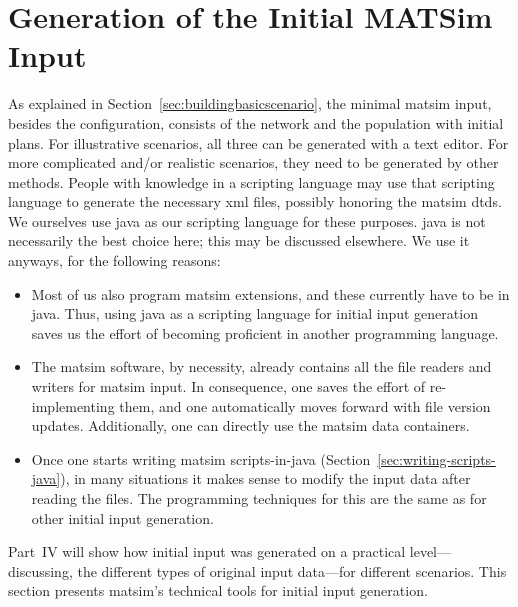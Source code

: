 \section{Generation of the Initial MATSim Input}
\label{sec:extending:initial-input}

As explained in Section~\ref{sec:buildingbasicscenario}, the minimal \gls{matsim} input, besides the configuration, consists of the network and the population with initial plans.  For illustrative scenarios, all three can be generated with a text editor.  For more complicated and/or realistic scenarios, they need to be generated by other methods.  People with knowledge in a scripting language may use that scripting language to generate the necessary \gls{xml} files, possibly honoring the \gls{matsim} \glspl{dtd}.  We ourselves use \gls{java} as our scripting language for these purposes.  \gls{java} is not necessarily the best choice here; this may be discussed elsewhere.  We use it anyways, for the following reasons:
\begin{itemize}

\item Most of us also program \gls{matsim} extensions, and these currently have to be in \gls{java}.  Thus, using \gls{java} as a scripting language for initial input generation saves us the effort of becoming proficient in another programming language.

\item The \gls{matsim} software, by necessity, already contains all the file readers and writers for \gls{matsim} input.  In consequence, one saves the effort of re-implementing them, and one automatically moves forward with file version updates.  Additionally, one can directly use the \gls{matsim} data containers.

\item Once one starts writing \gls{matsim} scripts-in-\gls{java} (Section~\ref{sec:writing-scripts-java}), in many situations it makes sense to modify the input data after reading the files.  The programming techniques for this are the same as for other initial input generation.

\end{itemize}
Part~IV will show how initial input was generated on a practical level---discussing, \eg the different types of original input data---for different scenarios.  This section  presents \gls{matsim}'s technical tools for initial input generation.
